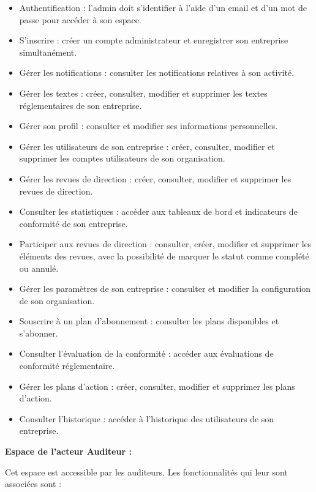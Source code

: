 \begin{itemize}
  \item Authentification : l'admin doit s'identifier à l'aide d'un email et d'un mot de passe pour accéder à son espace.
  \item S'inscrire : créer un compte administrateur et enregistrer son entreprise simultanément.
  \item Gérer les notifications : consulter les notifications relatives à son activité.
  \item Gérer les textes : créer, consulter, modifier et supprimer les textes réglementaires de son entreprise.
  \item Gérer son profil : consulter et modifier ses informations personnelles.
  \item Gérer les utilisateurs de son entreprise : créer, consulter, modifier et supprimer les comptes utilisateurs de son organisation.
  \item Gérer les revues de direction : créer, consulter, modifier et supprimer les revues de direction.
  \item Consulter les statistiques : accéder aux tableaux de bord et indicateurs de conformité de son entreprise.
  \item Participer aux revues de direction : consulter, créer, modifier et supprimer les éléments des revues, avec la possibilité de marquer le statut comme complété ou annulé.
  \item Gérer les paramètres de son entreprise : consulter et modifier la configuration de son organisation.
  \item Souscrire à un plan d'abonnement : consulter les plans disponibles et s'abonner.
  \item Consulter l'évaluation de la conformité : accéder aux évaluations de conformité réglementaire.
  \item Gérer les plans d'action : créer, consulter, modifier et supprimer les plans d'action.
  \item Consulter l'historique : accéder à l'historique des utilisateurs de son entreprise.
\end{itemize}

\noindent\textbf{Espace de l'acteur Auditeur :}

\noindent Cet espace est accessible par les auditeurs. Les fonctionnalités qui leur sont associées sont :

